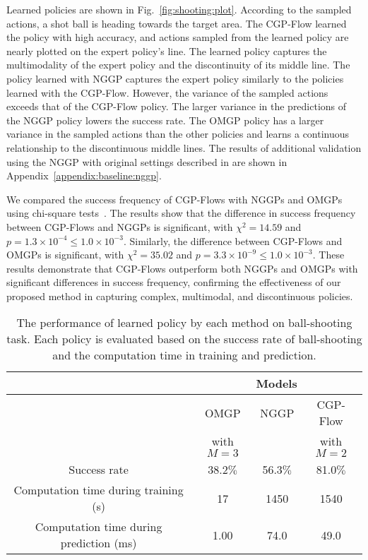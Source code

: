 \documentclass[sn-mathphys-num]{sn-jnl}
\begin{document}
Learned policies are shown in  Fig.~\ref{fig:shooting:plot}.
According to the sampled actions, a shot ball is heading towards the target area.
The CGP-Flow learned the policy with high accuracy, and actions sampled from the learned policy are nearly plotted on the expert policy's line.
The learned policy captures the multimodality of the expert policy and the discontinuity of its middle line.
The policy learned with NGGP captures the expert policy similarly to the policies learned with the CGP-Flow.
However, the variance of the sampled actions exceeds that of the CGP-Flow policy.
The larger variance in the predictions of the NGGP policy lowers the success rate.
The OMGP policy has a larger variance in the sampled actions than the other policies and learns a continuous relationship to the discontinuous middle lines.
The results of additional validation using the NGGP with original settings described in \cite{sendera2021non} are shown in Appendix~\ref{appendix:baseline:nggp}.


We compared the success frequency of CGP-Flows with NGGPs and OMGPs using chi-square tests~\cite{franke2012chi}.
The results show that the difference in success frequency between CGP-Flows and NGGPs is significant, with $\chi^2 = 14.59$ and $p = 1.3 \times 10^{-4} \leq 1.0 \times 10^{-3}$.
Similarly, the difference between CGP-Flows and OMGPs is significant, with $\chi^2 = 35.02$ and $p = 3.3 \times 10^{-9}\leq 1.0 \times 10^{-3}$.
These results demonstrate that CGP-Flows outperform both NGGPs and OMGPs with significant differences in success frequency, confirming the effectiveness of our proposed method in capturing complex, multimodal, and discontinuous policies.


\begin{table}[!t]
    \centering
    \caption{The performance of learned policy by each method on ball-shooting task. Each policy is evaluated based on the success rate of ball-shooting and the computation time in training and prediction.}
    \label{tab:shooting:success_rate}
    \begin{tabular}{|c||c|c|c|} \hline
                      & \multicolumn{3}{c|}{Models}        \\ \hline
                      & OMGP       & NGGP     & CGP-Flow  \\ 
                      & with $M=3$ &          & with $M=2$ \\ \hline \hline
        Success rate  & 38.2$\%$   & 56.3$\%$ & 81.0$\%$   \\ \hline
        Computation time during training (s)
                      & 17         & 1450     & 1540     \\ \hline
        Computation time during prediction (ms) 
                      & 1.00       & 74.0     & 49.0       \\ \hline
    \end{tabular}
\end{table}
\end{document}
